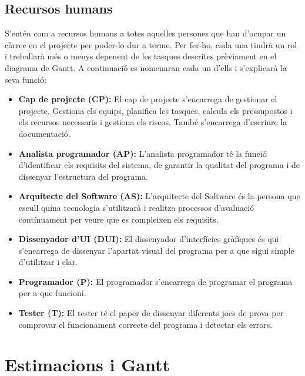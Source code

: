 \documentclass[a4paper]{article}
\begin{document}
\subsection{Recursos humans}
S'entén com a recursos humans a totes aquelles persones que han d'ocupar un càrrec en el projecte per poder-lo dur a terme. Per fer-ho, cada una tindrà un rol i treballarà més o menys depenent de les tasques descrites prèviament en el diagrama de Gantt. A continuació es nomenaran cada un d'ells i s'explicarà la seva funció:
\begin{itemize}
    \item \textbf{Cap de projecte (CP):} El cap de projecte s'encarrega de gestionar el projecte. Gestiona els equips, planifica les tasques, calcula els pressupostos i els recursos necessaris i gestiona els riscos. També s'encarrega d'escriure la documentació.
    
    \item \textbf{Analista programador (AP):} L'analista programador té la funció d'identificar els requisits del sistema, de garantir la qualitat del programa i de dissenyar l'estructura del programa.
    
    \item \textbf{Arquitecte del Software (AS):} L'arquitecte del Software és la persona que escull quina tecnologia s'utilitzarà i realitza processos d'avaluació contínuament per veure que es compleixen els requisits.
    
    \item \textbf{Dissenyador d'UI (DUI):} El dissenyador d'interfícies gràfiques és qui s'encarrega de dissenyar l'apartat visual del programa per a que sigui simple d'utilitzar i clar. 
    
    \item \textbf{Programador (P):} El programador s'encarrega de programar el programa per a que funcioni.
    
    \item \textbf{Tester (T):} El tester té el paper de dissenyar diferents jocs de prova per comprovar el funcionament correcte del programa i detectar els errors.
\end{itemize}

\newpage
\section{Estimacions i Gantt}
\end{document}
